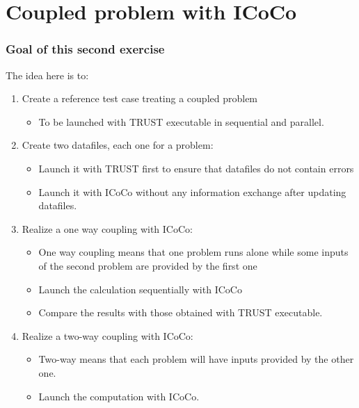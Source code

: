 \documentclass[10pt, hyperref={unicode=true,pdfusetitle, bookmarks=true,bookmarksnumbered=false,bookmarksopen=false, breaklinks=false,pdfborder={0 0 1},backref=true,colorlinks=true,linkcolor=darkblue,pageanchor, urlcolor=darkblue}]{beamer}
\begin{document}
\section{{\bf{Coupled problem with ICoCo}}}
\begin{frame}
\frametitle{Goal of this second exercise}
\begin{block}{}
The idea here is to:

\begin{enumerate}
\item  Create a reference test case treating a coupled problem 
\begin{itemize}
\item To be launched with TRUST executable in sequential and parallel.
\end{itemize}\vspace{0.1cm}
\item Create two datafiles, each one for a problem:
\begin{itemize} 
\item Launch it with TRUST first to ensure that datafiles do not contain errors
\item Launch it with ICoCo without any information exchange after updating datafiles.
\end{itemize}\vspace{0.1cm}
\item Realize a one way coupling with ICoCo:
\begin{itemize}
\item One way coupling means that one problem runs alone while some inputs of the second problem are provided by the first one 
\item Launch the calculation sequentially with ICoCo
\item Compare the results with those obtained with TRUST executable.
\end{itemize}\vspace{0.1cm}
\item Realize a two-way coupling with ICoCo:
\begin{itemize}
\item Two-way means that each problem will have inputs provided by the other one.
\item Launch the computation with ICoCo.
\end{itemize}
\end{enumerate}

\end{block}
\end{frame}
\end{document}
